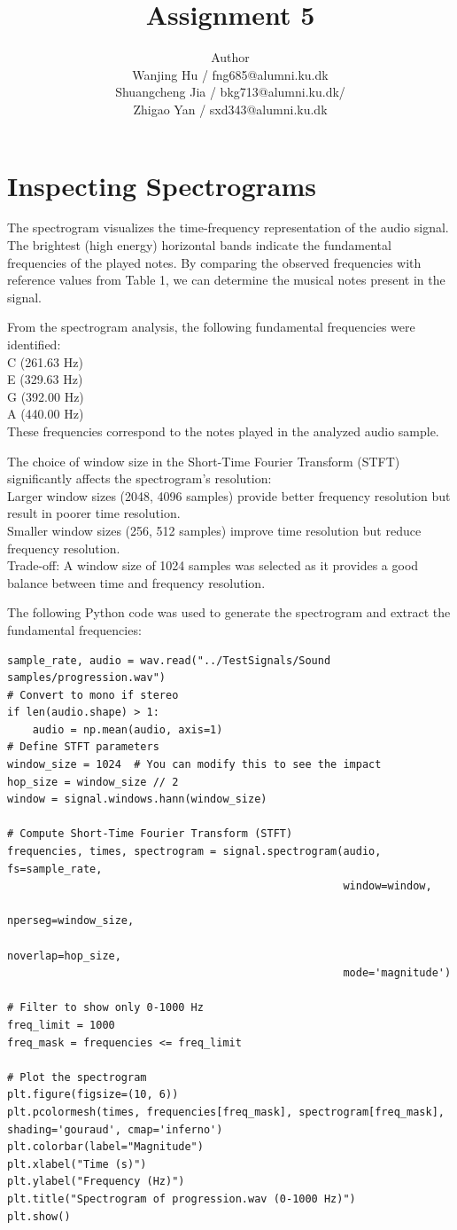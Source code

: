 \documentclass[12pt]{article}
\title{Assignment 5}
\author{Author \\
 Wanjing Hu / fng685@alumni.ku.dk  \\
 Shuangcheng Jia / bkg713@alumni.ku.dk/   \\
 Zhigao Yan / sxd343@alumni.ku.dk  \\
}
\begin{document}
\maketitle

\section{Inspecting Spectrograms}
The spectrogram visualizes the time-frequency representation of the audio signal. The brightest (high energy) horizontal bands indicate the fundamental frequencies of the played notes. By comparing the observed frequencies with reference values from Table 1, we can determine the musical notes present in the signal.

From the spectrogram analysis, the following fundamental frequencies were identified:\\
C (261.63 Hz)\\
E (329.63 Hz)\\
G (392.00 Hz)\\
A (440.00 Hz)\\
These frequencies correspond to the notes played in the analyzed audio sample.

The choice of window size in the Short-Time Fourier Transform (STFT) significantly affects the spectrogram's resolution:\\
Larger window sizes (2048, 4096 samples) provide better frequency resolution but result in poorer time resolution.\\
Smaller window sizes (256, 512 samples) improve time resolution but reduce frequency resolution.\\
Trade-off: A window size of 1024 samples was selected as it provides a good balance between time and frequency resolution.

The following Python code was used to generate the spectrogram and extract the fundamental frequencies:
\begin{lstlisting}
sample_rate, audio = wav.read("../TestSignals/Sound samples/progression.wav")
# Convert to mono if stereo
if len(audio.shape) > 1:
    audio = np.mean(audio, axis=1)
# Define STFT parameters
window_size = 1024  # You can modify this to see the impact
hop_size = window_size // 2
window = signal.windows.hann(window_size)

# Compute Short-Time Fourier Transform (STFT)
frequencies, times, spectrogram = signal.spectrogram(audio, fs=sample_rate, 
                                                     window=window, 
                                                     nperseg=window_size, 
                                                     noverlap=hop_size, 
                                                     mode='magnitude')

# Filter to show only 0-1000 Hz
freq_limit = 1000
freq_mask = frequencies <= freq_limit

# Plot the spectrogram
plt.figure(figsize=(10, 6))
plt.pcolormesh(times, frequencies[freq_mask], spectrogram[freq_mask], shading='gouraud', cmap='inferno')
plt.colorbar(label="Magnitude")
plt.xlabel("Time (s)")
plt.ylabel("Frequency (Hz)")
plt.title("Spectrogram of progression.wav (0-1000 Hz)")
plt.show()
\end{lstlisting}
\end{document}
